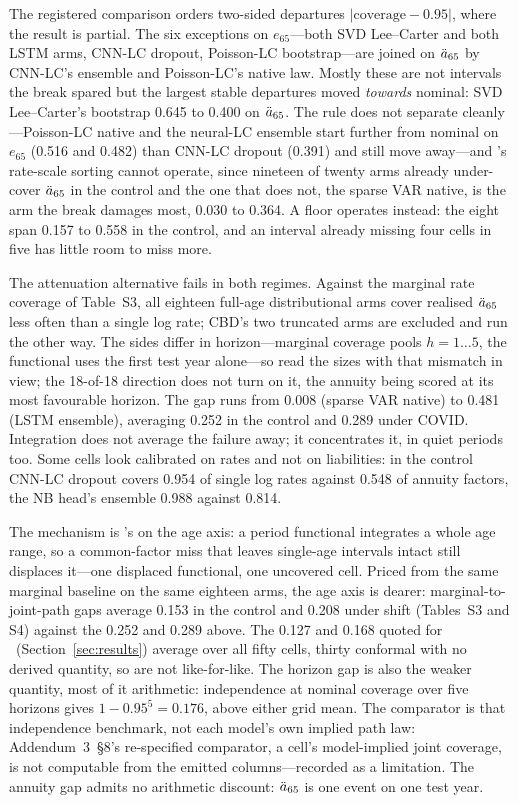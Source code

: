 The registered comparison orders two-sided departures
$|\text{coverage}-0.95|$, where the result is partial. The six exceptions on
$e_{65}$---both SVD Lee--Carter and both LSTM arms, CNN-LC dropout, Poisson-LC
bootstrap---are joined on $\ddot{a}_{65}$ by CNN-LC's ensemble and Poisson-LC's
native law. Mostly these are not intervals the break spared but the
largest stable departures moved \emph{towards} nominal: SVD Lee--Carter's
bootstrap 0.645 to 0.400 on $\ddot{a}_{65}$. The rule does not separate
cleanly---Poisson-LC native and the neural-LC ensemble start further from
nominal on $e_{65}$ (0.516 and 0.482) than CNN-LC dropout (0.391) and still
move away---and \Htwo's rate-scale sorting cannot operate, since nineteen of
twenty arms already under-cover $\ddot{a}_{65}$ in the control and the one that does
not, the sparse VAR native, is the arm the break damages most, 0.030 to 0.364.
A floor operates instead: the eight span 0.157 to 0.558 in the control, and an
interval already missing four cells in five has little room to miss more.

The attenuation alternative fails in both regimes. Against the marginal rate
coverage of Table~S3, all eighteen full-age distributional arms cover realised
$\ddot{a}_{65}$ less often than a single log rate; CBD's two truncated arms are
excluded and run the other way. The sides differ in horizon---marginal
coverage pools $h=1\ldots5$, the functional uses the first test year alone---so
read the sizes with that mismatch in view; the 18-of-18 direction does not turn
on it, the annuity being scored at its most favourable horizon. The gap runs
from 0.008 (sparse VAR native) to 0.481 (LSTM ensemble), averaging 0.252 in the
control and 0.289 under COVID. Integration does not average the failure away;
it concentrates it, in quiet periods too. Some cells look calibrated on rates and
not on liabilities: in the control CNN-LC dropout covers 0.954 of single log
rates against 0.548 of annuity factors, the NB head's
ensemble 0.988 against 0.814.

The mechanism is \Hthree's on the age axis: a period functional integrates a
whole age range, so a common-factor miss that leaves single-age intervals
intact still displaces it---one displaced functional, one uncovered cell.
Priced from the same marginal baseline on the same eighteen arms, the age axis
is dearer: marginal-to-joint-path gaps average 0.153 in the control and 0.208
under shift (Tables~S3 and S4) against the 0.252 and 0.289 above. The 0.127 and
0.168 quoted for \Hthree\ (Section~\ref{sec:results}) average over all fifty
cells, thirty conformal with no derived quantity, so are not like-for-like. The
horizon gap is also the weaker quantity, most of it arithmetic: independence at
nominal coverage over five horizons gives $1-0.95^5=0.176$, above either grid
mean. The comparator is that independence benchmark, not each model's own implied
path law: Addendum~3~\S8's re-specified comparator, a cell's model-implied
joint coverage, is not computable from the emitted columns---recorded as a
limitation. The annuity gap admits no arithmetic discount:
$\ddot{a}_{65}$ is one event on one test year.

